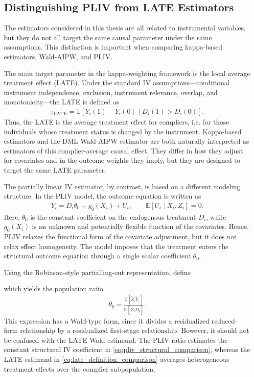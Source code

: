 \documentclass[12pt,a4paper]{article}
\begin{document}
\subsection{Distinguishing PLIV from LATE Estimators}
\label{subsec:pliv_vs_late}

The estimators considered in this thesis are all related to instrumental variables, but they do
not all target the same causal parameter under the same assumptions. This distinction is
important when comparing kappa-based estimators, Wald-AIPW, and PLIV.

The main target parameter in the kappa-weighting framework is the local average treatment
effect (LATE). Under the standard IV assumptions---conditional instrument independence,
exclusion, instrument relevance, overlap, and monotonicity---the LATE is defined as
\begin{align}
    \tau_{\mathrm{LATE}}
    =
    \mathbb{E}
    \left[
        Y_i(1)-Y_i(0)
        \mid
        D_i(1)>D_i(0)
    \right].
    \label{eq:late_definition_comparison}
\end{align}
Thus, the LATE is the average treatment effect for compliers, i.e. for those individuals whose
treatment status is changed by the instrument. Kappa-based estimators and the DML
Wald-AIPW estimator are both naturally interpreted as estimators of this complier-average
causal effect. They differ in how they adjust for covariates and in the outcome weights they
imply, but they are designed to target the same LATE parameter.

The partially linear IV estimator, by contrast, is based on a different modeling structure. In
the PLIV model, the outcome equation is written as
\begin{align}
    Y_i
    =
    D_i\theta_0
    +
    g_0(X_i)
    +
    U_i,
    \qquad
    \mathbb{E}[U_i\mid X_i,Z_i]=0.
    \label{eq:pliv_structural_comparison}
\end{align}
Here, \(\theta_0\) is the constant coefficient on the endogenous treatment \(D_i\), while
\(g_0(X_i)\) is an unknown and potentially flexible function of the covariates. Hence, PLIV
relaxes the functional form of the covariate adjustment, but it does not relax effect
homogeneity. The model imposes that the treatment enters the structural outcome equation
through a single scalar coefficient \(\theta_0\).

Using the Robinson-style partialling-out representation, define

which yields the population ratio
\begin{align}
    \theta_0
    =
    \frac{
        \mathbb{E}[\widetilde{Z}_i\widetilde{Y}_i]
    }{
        \mathbb{E}[\widetilde{Z}_i\widetilde{D}_i]
    }.
    \label{eq:pliv_ratio_comparison}
\end{align}
This expression has a Wald-type form, since it divides a residualized reduced-form relationship
by a residualized first-stage relationship. However, it should not be confused with the LATE
Wald estimand. The PLIV ratio estimates the constant structural IV coefficient in
\eqref{eq:pliv_structural_comparison}, whereas the LATE estimand in
\eqref{eq:late_definition_comparison} averages heterogeneous treatment effects over the
complier subpopulation.
\end{document}
